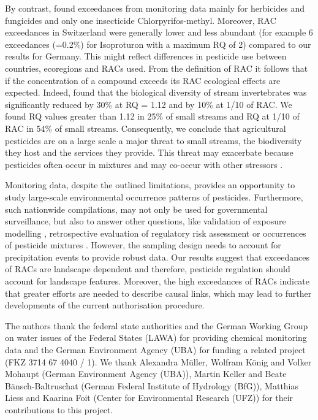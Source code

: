 \documentclass[journal=esthag,manuscript=article]{achemso}
\begin{document}
By contrast, \citet{knauer_pesticides_2016} found exceedances from monitoring data mainly for herbicides and fungicides and only one insecticide Chlorpyrifos-methyl.
Moreover, RAC exceedances in Switzerland were generally lower and less abundant (for example 6 exceedances (=0.2\%) for Isoproturon with a maximum RQ of 2) compared to our results for Germany. 
This might reflect differences in pesticide use between countries, ecoregions and RACs used. 
From the definition of RAC it follows that if the concentration of a compound exceeds its RAC ecological effects are expected.
Indeed, \citet{stehle_agricultural_2015} found that the biological diversity of stream invertebrates was significantly reduced by 30\% at RQ = 1.12 and by 10\% at 1/10 of RAC.
We found RQ values greater than 1.12 in 25\% of small streams and RQ at 1/10 of RAC in 54\% of small streams. 
Consequently, we conclude that agricultural pesticides are on a large scale a major threat to small streams, the biodiversity they host and the services they provide. 
This threat may exacerbate because pesticides often occur in mixtures \cite{schreiner_pesticide_2016} and may co-occur with other stressors \citep{schafer_contribution_2016}. 

Monitoring data, despite the outlined limitations, provides an opportunity to study large-scale environmental occurrence patterns of pesticides.
Furthermore, such nationwide compilations, may not only be used for governmental surveillance, but also to answer other questions, like validation of exposure modelling \cite{knabel_fungicide_2014}, retrospective evaluation of regulatory risk assessment \citep{knauer_pesticides_2016,stehle_pesticide_2015}or occurrences of pesticide mixtures \cite{schreiner_pesticide_2016}.
However, the sampling design needs to account for precipitation events to provide robust data. 
Our results suggest that exceedances of RACs are landscape dependent %
and therefore, pesticide regulation should account for landscape features. 
Moreover, the high exceedances of RACs indicate that greater efforts are needed to describe causal links, which may lead to further developments of the current authorisation procedure.






\begin{acknowledgement}
The authors thank the federal state authorities and the German Working Group on water issues of the Federal States (LAWA) for providing chemical monitoring data and the German Environment Agency (UBA) for funding a related project (FKZ 3714 67 4040 / 1). 
We thank Alexandra Müller, Wolfram König and Volker Mohaupt (German Environment Agency (UBA)), Martin Keller and Beate Bänsch-Baltruschat (German Federal Institute of Hydrology (BfG)), Matthias Liess and Kaarina Foit (Center for Environmental Research (UFZ)) for their contributions to this project. 
\end{acknowledgement}
\end{document}
